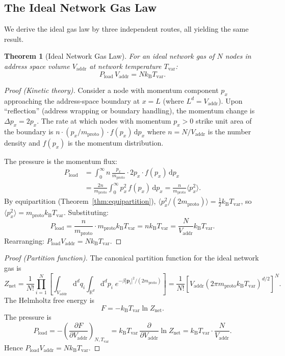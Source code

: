 \documentclass[11pt,twocolumn,a4paper]{article}
\newtheorem{theorem}{Theorem}[section]
\theoremstyle{definition}
\theoremstyle{remark}
\newcommand{\kB}{k_{\mathrm{B}}}
\newcommand{\Tvar}{T_{\mathrm{var}}}
\newcommand{\Pload}{P_{\mathrm{load}}}
\newcommand{\Vaddr}{V_{\mathrm{addr}}}
\newcommand{\mpr}{m_{\mathrm{proto}}}
\newcommand{\Znet}{Z_{\mathrm{net}}}
\newcommand{\dd}{\mathrm{d}}
\newcommand{\avg}[1]{\langle #1 \rangle}
\newcommand{\pder}[2]{\frac{\partial #1}{\partial #2}}
\begin{document}
\subsection{The Ideal Network Gas Law}\label{sec:gas_law}

We derive the ideal gas law by three independent routes, all yielding the same
result.

\begin{theorem}[Ideal Network Gas Law]\label{thm:gas_law}
For an ideal network gas of $N$ nodes in address space volume $\Vaddr$ at
network temperature $\Tvar$:
\begin{equation}\label{eq:ideal_gas}
  \boxed{\Pload\,\Vaddr = N\kB\Tvar.}
\end{equation}
\end{theorem}

\begin{proof}[Proof (Kinetic theory)]
Consider a node with momentum component $p_x$ approaching the address-space
boundary at $x=L$ (where $L^d=\Vaddr$).  Upon ``reflection'' (address
wrapping or boundary handling), the momentum change is $\Delta p_x=2p_x$.
The rate at which nodes with momentum $p_x>0$ strike unit area of the boundary
is $n\cdot(p_x/\mpr)\cdot f(p_x)\,\dd p_x$ where $n=N/\Vaddr$ is the
number density and $f(p_x)$ is the momentum distribution.

The pressure is the momentum flux:
\begin{align}
  \Pload &= \int_0^{\infty}n\,\frac{p_x}{\mpr}\cdot 2p_x\cdot f(p_x)
             \,\dd p_x \nonumber\\
         &= \frac{2n}{\mpr}\int_0^{\infty}p_x^2\,f(p_x)\,\dd p_x
          = \frac{n}{\mpr}\avg{p_x^2}. \label{eq:pressure_kinetic}
\end{align}
By equipartition (Theorem~\ref{thm:equipartition}),
$\avg{p_x^2/(2\mpr)}=\frac{1}{2}\kB\Tvar$, so $\avg{p_x^2}=\mpr\kB\Tvar$.
Substituting:
\[
  \Pload = \frac{n}{\mpr}\cdot\mpr\kB\Tvar = n\kB\Tvar
  = \frac{N}{\Vaddr}\kB\Tvar.
\]
Rearranging: $\Pload\Vaddr=N\kB\Tvar$.
\end{proof}

\begin{proof}[Proof (Partition function)]
The canonical partition function for the ideal network gas is
\begin{equation}\label{eq:partition_ideal}
  \Znet = \frac{1}{N!}\prod_{i=1}^{N}
  \left[\int_{\Vaddr}\dd^d q_i
  \int_{\mathbb{R}^d}\dd^d p_i\;
  e^{-\beta|\bm{p}_i|^2/(2\mpr)}\right]
  = \frac{1}{N!}\left[\Vaddr\left(2\pi\mpr\kB\Tvar\right)^{d/2}\right]^N.
\end{equation}
The Helmholtz free energy is
\begin{equation}\label{eq:helmholtz_ideal}
  F = -\kB\Tvar\ln\Znet.
\end{equation}
The pressure is
\begin{equation}
  \Pload = -\left(\pder{F}{\Vaddr}\right)_{N,\Tvar}
  = \kB\Tvar\,\pder{}{\Vaddr}\ln\Znet
  = \kB\Tvar\cdot\frac{N}{\Vaddr}.
\end{equation}
Hence $\Pload\Vaddr=N\kB\Tvar$.
\end{proof}
\end{document}
